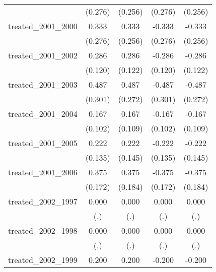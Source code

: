 {\begin{tabular}{l*{4}{c}}
            &     (0.276)         &     (0.256)         &     (0.276)         &     (0.256)         \\
[1em]
treated\_2001\_2000&       0.333         &       0.333         &      -0.333         &      -0.333         \\
            &     (0.276)         &     (0.256)         &     (0.276)         &     (0.256)         \\
[1em]
treated\_2001\_2002&       0.286\sym{*}  &       0.286\sym{*}  &      -0.286\sym{*}  &      -0.286\sym{*}  \\
            &     (0.120)         &     (0.122)         &     (0.120)         &     (0.122)         \\
[1em]
treated\_2001\_2003&       0.487         &       0.487         &      -0.487         &      -0.487         \\
            &     (0.301)         &     (0.272)         &     (0.301)         &     (0.272)         \\
[1em]
treated\_2001\_2004&       0.167         &       0.167         &      -0.167         &      -0.167         \\
            &     (0.102)         &     (0.109)         &     (0.102)         &     (0.109)         \\
[1em]
treated\_2001\_2005&       0.222         &       0.222         &      -0.222         &      -0.222         \\
            &     (0.135)         &     (0.145)         &     (0.135)         &     (0.145)         \\
[1em]
treated\_2001\_2006&       0.375\sym{*}  &       0.375\sym{*}  &      -0.375\sym{*}  &      -0.375\sym{*}  \\
            &     (0.172)         &     (0.184)         &     (0.172)         &     (0.184)         \\
[1em]
treated\_2002\_1997&       0.000         &       0.000         &       0.000         &       0.000         \\
            &         (.)         &         (.)         &         (.)         &         (.)         \\
[1em]
treated\_2002\_1998&       0.000         &       0.000         &       0.000         &       0.000         \\
            &         (.)         &         (.)         &         (.)         &         (.)         \\
[1em]
treated\_2002\_1999&       0.200         &       0.200         &      -0.200         &      -0.200         \\

\end{tabular}}
